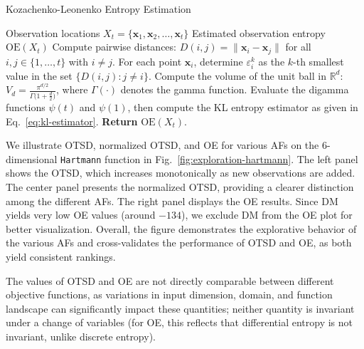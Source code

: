 \documentclass[accepted]{uai2025}
\begin{document}
\begin{algorithm}
\caption{Kozachenko-Leonenko Entropy Estimation}
\label{alg:kl-entropy}
\begin{algorithmic}[1]
\REQUIRE Observation locations \(X_t = \{\bm{x}_1, \bm{x}_2, \dots, \bm{x}_t\}\)
\ENSURE Estimated observation entropy \(\text{OE}(X_t)\)
\STATE Compute pairwise distances: \(D(i,j) = \|\bm{x}_i - \bm{x}_j\|\) for all \(i,j \in \{1,\dots,t\}\) with \(i \neq j\).
\STATE For each point \(\bm{x}_i\), determine \(\varepsilon_i^k\) as the \(k\)-th smallest value in the set \(\{D(i,j) : j \neq i\}\).
\STATE Compute the volume of the unit ball in \(\mathbb{R}^d\):
$V_d = \frac{\pi^{d/2}}{\Gamma\bigl(1 + \tfrac{d}{2}\bigr)}$,
where \(\Gamma(\cdot)\) denotes the gamma function.
\STATE Evaluate the digamma functions \(\psi(t)\) and \(\psi(1)\), then compute the KL entropy estimator as given in Eq.~\eqref{eq:kl-estimator}.
\STATE \textbf{Return} \(\text{OE}(X_t)\).
\end{algorithmic}
\end{algorithm}

We illustrate \ac{OTSD}, normalized \ac{OTSD}, and \ac{OE} for various \acp{AF} on the 6-dimensional \texttt{Hartmann} function in Fig.~\ref{fig:exploration-hartmann}. The left panel shows the \ac{OTSD}, which increases monotonically as new observations are added. The center panel presents the normalized \ac{OTSD}, providing a clearer distinction among the different \acp{AF}. The right panel displays the \ac{OE} results. Since DM yields very low OE values (around $-134$), we exclude DM from the OE plot for better visualization. Overall, the figure demonstrates the explorative behavior of the various \acp{AF} and cross-validates the performance of \ac{OTSD} and \ac{OE}, as both yield consistent rankings.

The values of \ac{OTSD} and \ac{OE} are not directly comparable between different objective functions, as variations in input dimension, domain, and function landscape can significantly impact these quantities; neither quantity is invariant under a change of variables (for OE, this reflects that differential entropy is not invariant, unlike discrete entropy). 
\end{document}
